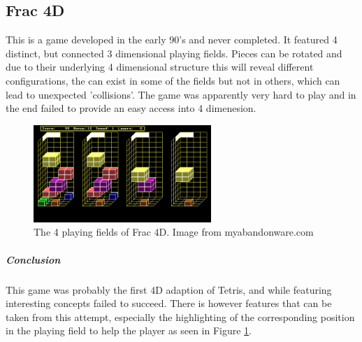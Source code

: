 \documentclass{article}
\begin{document}
\subsection{Frac 4D}
This is a game developed in the early 90's and never completed. It featured 4 distinct, but connected 3 dimensional playing fields. Pieces can be rotated and due to their underlying 4 dimensional structure this will reveal different configurations, the can exist in some of the fields but not in others, which can lead to unexpected 'collisions'. The game was apparently very hard to play and in the end failed to provide an easy access into 4 dimenesion.
\begin{figure}
    \label{fig:frac4d}
    \centering
    \includegraphics[width=0.6\textwidth]{frac4d.png}
    \caption{The 4 playing fields of Frac 4D. Image from myabandonware.com}
\end{figure}

\subparagraph*{Conclusion}
This game was probably the first 4D adaption of Tetris, and while featuring interesting concepts failed to succeed. There is however features that can be taken from this attempt, especially the highlighting of the corresponding position in the playing field to help the player as seen in Figure \ref{fig:frac4d}.
\end{document}
